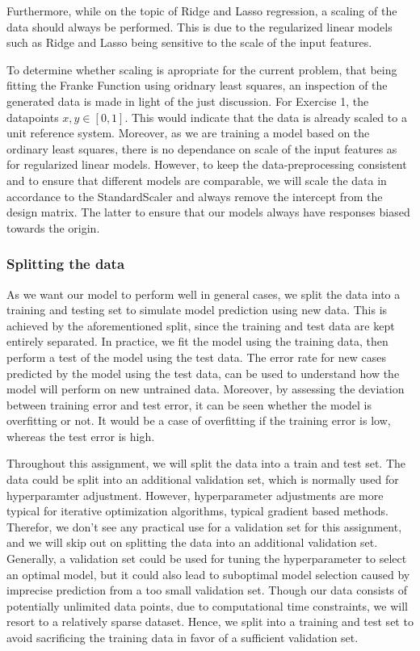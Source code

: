 \documentclass[11pt, a4paper]{article}
\begin{document}
Furthermore, while on the topic of Ridge and Lasso regression, a scaling of the data should always be performed. This is due to the regularized linear models such as Ridge and Lasso being sensitive to the scale of the input features. \cite{Geron2019}

To determine whether scaling is apropriate for the current problem, that being fitting the Franke Function using oridnary least squares, an inspection of the generated data is made in light of the just discussion. For Exercise 1, the datapoints $x,y \in \left[0,1\right]$. This would indicate that the data is already scaled to a unit reference system. Moreover, as we are training a model based on the ordinary least squares, there is no dependance on scale of the input features as for regularized linear models. However, to keep the data-preprocessing consistent and to ensure that different models are comparable, we will scale the data in accordance to the StandardScaler and always remove the intercept from the design matrix. The latter to ensure that our models always have responses biased towards the origin.

\subsubsection*{Splitting the data}
As we want our model to perform well in general cases, we split the data into a training and testing set to simulate model prediction using new data. This is achieved by the aforementioned split, since the training and test data are kept entirely separated. In practice, we fit the model using the training data, then perform a test of the model using the test data. The error rate for new cases predicted by the model using the test data, can be used to understand how the model will perform on new untrained data. \cite{Geron2019} Moreover, by assessing the deviation between training error and test error, it can be seen whether the model is overfitting or not. It would be a case of overfitting if the training error is low, whereas the test error is high.

Throughout this assignment, we will split the data into a train and test set. The data could be split into an additional validation set, which is normally used for hyperparamter adjustment. However, hyperparameter adjustments are more typical for iterative optimization algorithms, typical
gradient based methods. Therefor, we don't see any practical use for a validation set for this assignment, and we will skip out on splitting the data into an additional validation set. Generally, a validation set could be used for tuning the hyperparameter to select an optimal model, but it could also lead to suboptimal model selection caused by imprecise prediction from a too small validation set. \cite{Geron2019} Though our data consists of potentially unlimited data points, due to computational time constraints, we will resort to a relatively sparse dataset. Hence, we split into a training and test set to avoid sacrificing the training data in favor of a sufficient validation set.
\end{document}
